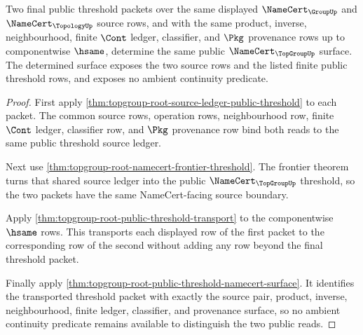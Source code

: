 \begin{theorem}
\label{thm:topgroup-root-public-threshold-joint-source-determinacy}
Two final public threshold packets over the same displayed
$\NameCert_{\GroupUp}$ and $\NameCert_{\TopologyUp}$ source rows, and with the
same product, inverse, neighbourhood, finite $\Cont$ ledger, classifier, and
$\Pkg$ provenance rows up to componentwise $\hsame$, determine the same public
$\NameCert_{\TopGroupUp}$ surface. The determined surface exposes the two
source rows and the listed finite public threshold rows, and exposes no
ambient continuity predicate.
\end{theorem}
\begin{proof}
First apply
\autoref{thm:topgroup-root-source-ledger-public-threshold} to each packet.
The common source rows, operation rows, neighbourhood row, finite $\Cont$
ledger, classifier row, and $\Pkg$ provenance row bind both reads to the same
public threshold source ledger.

Next use \autoref{thm:topgroup-root-namecert-frontier-threshold}. The frontier
theorem turns that shared source ledger into the public
$\NameCert_{\TopGroupUp}$ threshold, so the two packets have the same
NameCert-facing source boundary.

Apply \autoref{thm:topgroup-root-public-threshold-transport} to the
componentwise $\hsame$ rows. This transports each displayed row of the first
packet to the corresponding row of the second without adding any row beyond
the final threshold packet.

Finally apply \autoref{thm:topgroup-root-public-threshold-namecert-surface}.
It identifies the transported threshold packet with exactly the source pair,
product, inverse, neighbourhood, finite ledger, classifier, and provenance
surface, so no ambient continuity predicate remains available to distinguish
the two public reads.
\end{proof}
